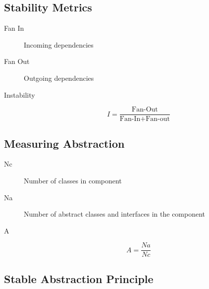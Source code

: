 \documentclass[../Main.tex]{subfiles}
\begin{document}

\subsection{Stability Metrics}
\begin{description}
    \item[Fan In] Incoming dependencies
    \item[Fan Out] Outgoing dependencies
    \item[Instability] \begin{equation}
            I = \frac{\text{Fan-Out}}{\text{Fan-In} + \text{Fan-out}}
        \end{equation}
\end{description}

\subsection{Measuring Abstraction}
\begin{description}
    \item[Nc] Number of classes in component
    \item[Na] Number of abstract classes and interfaces in the component
    \item[A] \begin{equation}
            A = \frac{Na}{Nc}
        \end{equation}
\end{description}

\subsection{Stable Abstraction Principle}
\end{document}
